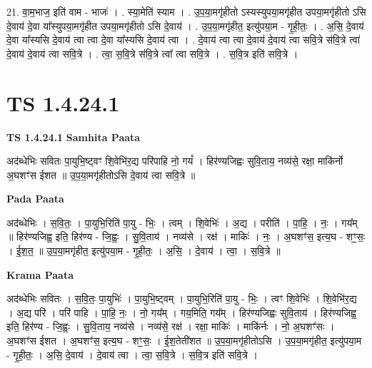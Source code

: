 \documentclass[17pt]{extarticle}
\begin{document}
21. वा॒म॒भाज॒ इति॑ वाम - भाजः॑ । . स्या॒मेति॑ स्याम । . उ॒प॒या॒मगृ॑हीतो ऽस्यस्युपया॒मगृ॑हीत उपया॒मगृ॑हीतो ऽसि दे॒वाय॑ दे॒वा या᳚स्युपया॒मगृ॑हीत उपया॒मगृ॑हीतो ऽसि दे॒वाय॑ । . उ॒प॒या॒मगृ॑हीत॒ इत्यु॑पया॒म - गृ॒ही॒तः॒ । . अ॒सि॒ दे॒वाय॑ दे॒वा या᳚स्यसि दे॒वाय॑ त्वा त्वा दे॒वा या᳚स्यसि दे॒वाय॑ त्वा । . दे॒वाय॑ त्वा त्वा दे॒वाय॑ दे॒वाय॑ त्वा सवि॒त्रे स॑वि॒त्रे त्वा॑ दे॒वाय॑ दे॒वाय॑ त्वा सवि॒त्रे । . त्वा॒ स॒वि॒त्रे स॑वि॒त्रे त्वा᳚ त्वा सवि॒त्रे । . स॒वि॒त्र इति॑ सवि॒त्रे । \newline
\pagebreak
{}
\section*{ TS 1.4.24.1 }

\textbf{TS 1.4.24.1 } \newline
\textbf{Samhita Paata} \newline

अद॑ब्धेभिः सवितः पा॒युभि॒ष्ट्वꣳ शि॒वेभि॑र॒द्य परि॑पाहि नो॒ गयं᳚ । हिर॑ण्यजिह्वः सुवि॒ताय॒ नव्य॑से॒ रक्षा॒ माकि॑र्नो अ॒घशꣳ॑स ईशत ॥ उ॒प॒या॒मगृ॑हीतोऽसि दे॒वाय॑ त्वा सवि॒त्रे ॥ \newline

\textbf{Pada Paata} \newline

अद॑ब्धेभिः । स॒वि॒तः॒ । पा॒युभि॒रिति॑ पा॒यु - भिः॒ । त्वम् । शि॒वेभिः॑ । अ॒द्य । परीति॑ । पा॒हि॒ । नः॒ । गय᳚म् ॥ हिर॑ण्यजिह्व॒ इति॒ हिर॑ण्य - जि॒ह्वः॒ । सु॒वि॒ताय॑ । नव्य॑से । रक्ष॑ । माकिः॑ । नः॒ । अ॒घशꣳ॑स॒ इत्य॒घ - शꣳ॒॒सः॒ । ई॒श॒त॒ ॥ उ॒प॒या॒मगृ॑हीत॒ इत्यु॑पया॒म - गृ॒ही॒तः॒ । अ॒सि॒ । दे॒वाय॑ । त्वा॒ । स॒वि॒त्रे ॥  \newline


\textbf{Krama Paata} \newline

अद॑ब्धेभिः सवितः । स॒वि॒तः॒ पा॒युभिः॑ । पा॒युभि॒ष्ट्वम् । पा॒युभि॒रिति॑ पा॒यु - भिः॒ । त्वꣳ शि॒वेभिः॑ । शि॒वेभि॑र॒द्य । अ॒द्य परि॑ । परि॑ पाहि । पा॒हि॒ नः॒ । नो॒ गय᳚म् । गय॒मिति॒ गय᳚म् । हिर॑ण्यजिह्वः सुवि॒ताय॑ । हिर॑ण्यजिह्व॒ इति॒ हिर॑ण्य - जि॒ह्वः॒ । सु॒वि॒ताय॒ नव्य॑से । नव्य॑से॒ रक्ष॑ । रक्षा॒ माकिः॑ । माकि॑र्नः । नो॒ अ॒घशꣳ॑सः । अ॒घशꣳ॑स ईशत । अ॒घशꣳ॑स॒ इत्य॒घ - शꣳ॒॒सः॒ । ई॒श॒तेती॑शत ॥ उ॒प॒या॒मगृ॑हीतोऽसि । उ॒प॒या॒मगृ॑हीत॒ इत्यु॑पया॒म - गृ॒ही॒तः॒ । अ॒सि॒ दे॒वाय॑ । दे॒वाय॑ त्वा । त्वा॒ स॒वि॒त्रे । स॒वि॒त्र इति॑ सवि॒त्रे । \newline
\end{document}
